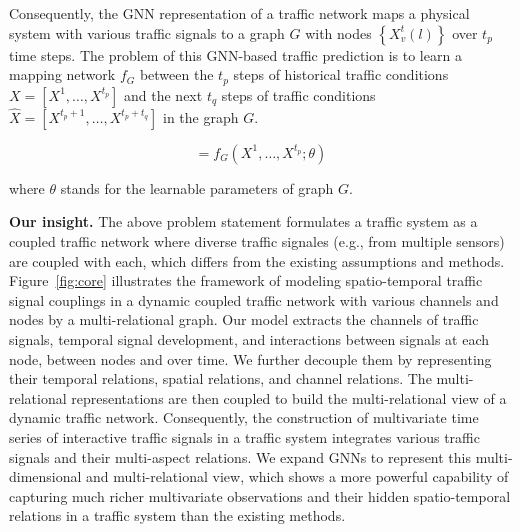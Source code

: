 Consequently, the GNN representation of a traffic network maps a physical system with various traffic signals to a graph $G$ with nodes $\left\{X_v^{t}(l)\right\}$ over $t_p$ time steps. The problem of this GNN-based traffic prediction is to learn a mapping network $f_G$ between the $t_p$ steps of historical traffic conditions $X = [X^1,\dots, X^{t_p}]$ and the next $t_q$ steps of traffic conditions $\hat{X} = [X^{t_p + 1},\dots, X^{t_p + t_q}]$ in the graph $G$.

\begin{equation}
    [X^{t_p + 1}, \dots , X^{t_p + t_q}] = f_G(X^1, \dots, X^{t_p};\theta)
    \label{eqn:target_function}
\end{equation}

where $\theta$ stands for the learnable parameters of graph $G$.

\textbf{Our insight.} The above problem statement formulates a traffic system as a coupled traffic network where diverse traffic signales (e.g., from multiple sensors) are coupled with each, which differs from the existing assumptions and methods. Figure~\ref{fig:core} illustrates the framework of modeling spatio-temporal traffic signal couplings in a dynamic coupled traffic network with various channels and nodes by a multi-relational graph. Our model extracts the channels of traffic signals, temporal signal development, and interactions between signals at each node, between nodes and over time. We further decouple them by representing their temporal relations, spatial relations, and channel relations. The multi-relational representations are then coupled to build the multi-relational view of a dynamic traffic network. Consequently, the construction of multivariate time series of interactive traffic signals in a traffic system integrates various traffic signals and their multi-aspect relations. We expand GNNs to represent this multi-dimensional and multi-relational view, which shows a more powerful capability of capturing much richer multivariate observations and their hidden spatio-temporal relations in a traffic system than the existing methods.

